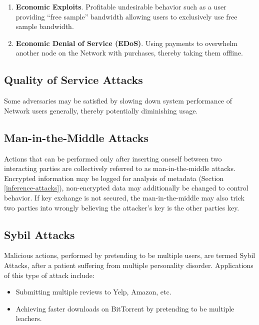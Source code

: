 \begin{enumerate}
\item \textbf{Economic Exploits}. Profitable undesirable behavior such as a user providing “free sample” bandwidth allowing users to exclusively use free sample bandwidth.
\item \textbf{Economic Denial of Service (EDoS)}. Using payments to overwhelm another node on the \Orchid{} Network with purchases, thereby taking them offline.
\end{enumerate}

\subsection{Quality of Service Attacks}
\label{qos}

Some adversaries may be satisfied by slowing down system performance of \Orchid{} Network users generally, thereby potentially diminishing usage.

\subsection{Man-in-the-Middle Attacks}
\label{mitm}

Actions that can be performed only after inserting oneself between two interacting parties are collectively referred to as man-in-the-middle attacks. Encrypted information may be logged for analysis of metadata (Section \ref{inference-attacks}), non-encrypted data may additionally be changed to control behavior. If key exchange is not secured, the man-in-the-middle may also trick two parties into wrongly believing the attacker's key is the other parties key.

\subsection{Sybil Attacks}

Malicious actions, performed by pretending to be multiple users, are termed Sybil Attacks, after a patient suffering from multiple personality disorder. Applications of this type of attack include:

\begin{itemize}
\item Submitting multiple reviews to Yelp, Amazon, etc.
\item Achieving faster downloads on BitTorrent by pretending to be multiple leachers\cite{freeridingBittorrent}.
\end{itemize}

